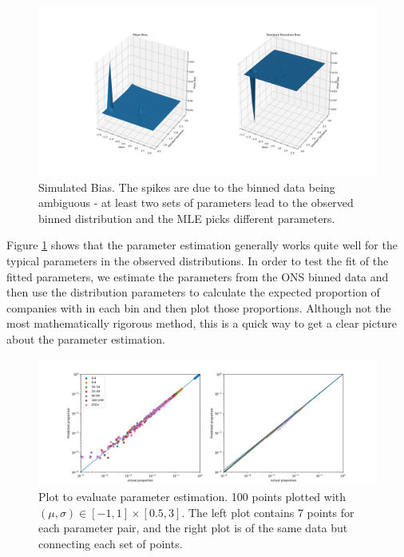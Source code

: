\documentclass[a4paper,10pt]{article}
\begin{document}
   \begin{figure}[!ht]
      \begin{center}
         \caption{Simulated Bias. The spikes are due to the binned data being ambiguous - at least two sets of parameters lead to the observed binned distribution and the MLE picks different parameters.}
         \label{bias}
         \includegraphics[width=\textwidth]{graphs/bias}
      \end{center}
   \end{figure}
   Figure \ref{bias} shows that the parameter estimation generally works quite well for the typical parameters in the observed distributions. In order to test the fit of the fitted parameters, we estimate the parameters from the ONS binned data and then use the distribution parameters to calculate the expected proportion of companies with in each bin and then plot those proportions. Although not the most mathematically rigorous method, this is a quick way to get a clear picture about the parameter estimation.
   \begin{figure}[!ht]
      \begin{center}
         \caption{Plot to evaluate parameter estimation. 100 points plotted with $(\mu, \sigma) \in [-1, 1] \times [0.5, 3]$. The left plot contains 7 points for each parameter pair, and the right plot is of the same data but connecting each set of points.}
         \label{parameter_reconstruction}
         \includegraphics[width=\textwidth]{graphs/loglog_reconstruction}
      \end{center}
   \end{figure}
\end{document}
